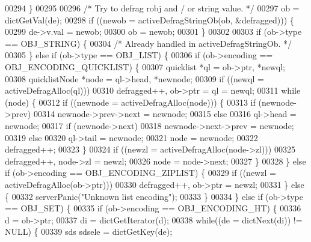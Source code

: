 \begin{DoxyCode}
00294     \}
00295 
00296     \textcolor{comment}{/* Try to defrag robj and / or string value. */}
00297     ob = dictGetVal(de);
00298     \textcolor{keywordflow}{if} ((newob = activeDefragStringOb(ob, &defragged))) \{
00299         de->v.val = newob;
00300         ob = newob;
00301     \}
00302 
00303     \textcolor{keywordflow}{if} (ob->type == OBJ\_STRING) \{
00304         \textcolor{comment}{/* Already handled in activeDefragStringOb. */}
00305     \} \textcolor{keywordflow}{else} \textcolor{keywordflow}{if} (ob->type == OBJ\_LIST) \{
00306         \textcolor{keywordflow}{if} (ob->encoding == OBJ\_ENCODING\_QUICKLIST) \{
00307             quicklist *ql = ob->ptr, *newql;
00308             quicklistNode *node = ql->head, *newnode;
00309             \textcolor{keywordflow}{if} ((newql = activeDefragAlloc(ql)))
00310                 defragged++, ob->ptr = ql = newql;
00311             \textcolor{keywordflow}{while} (node) \{
00312                 \textcolor{keywordflow}{if} ((newnode = activeDefragAlloc(node))) \{
00313                     \textcolor{keywordflow}{if} (newnode->prev)
00314                         newnode->prev->next = newnode;
00315                     \textcolor{keywordflow}{else}
00316                         ql->head = newnode;
00317                     \textcolor{keywordflow}{if} (newnode->next)
00318                         newnode->next->prev = newnode;
00319                     \textcolor{keywordflow}{else}
00320                         ql->tail = newnode;
00321                     node = newnode;
00322                     defragged++;
00323                 \}
00324                 \textcolor{keywordflow}{if} ((newzl = activeDefragAlloc(node->zl)))
00325                     defragged++, node->zl = newzl;
00326                 node = node->next;
00327             \}
00328         \} \textcolor{keywordflow}{else} \textcolor{keywordflow}{if} (ob->encoding == OBJ\_ENCODING\_ZIPLIST) \{
00329             \textcolor{keywordflow}{if} ((newzl = activeDefragAlloc(ob->ptr)))
00330                 defragged++, ob->ptr = newzl;
00331         \} \textcolor{keywordflow}{else} \{
00332             serverPanic(\textcolor{stringliteral}{"Unknown list encoding"});
00333         \}
00334     \} \textcolor{keywordflow}{else} \textcolor{keywordflow}{if} (ob->type == OBJ\_SET) \{
00335         \textcolor{keywordflow}{if} (ob->encoding == OBJ\_ENCODING\_HT) \{
00336             d = ob->ptr;
00337             di = dictGetIterator(d);
00338             \textcolor{keywordflow}{while}((de = dictNext(di)) != NULL) \{
00339                 sds sdsele = dictGetKey(de);

\end{DoxyCode}

